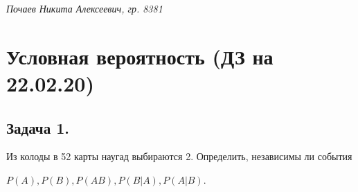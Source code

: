 


	
\textit{Почаев Никита Алексеевич, гр. 8381}

\section*{Условная вероятность (ДЗ на 22.02.20)}

\subsection*{Задача 1.}

Из колоды в 52 карты наугад выбираются 2. Определить, независимы ли события 

$P(A), P(B), P(AB), P(B|A), P(A|B)$.

